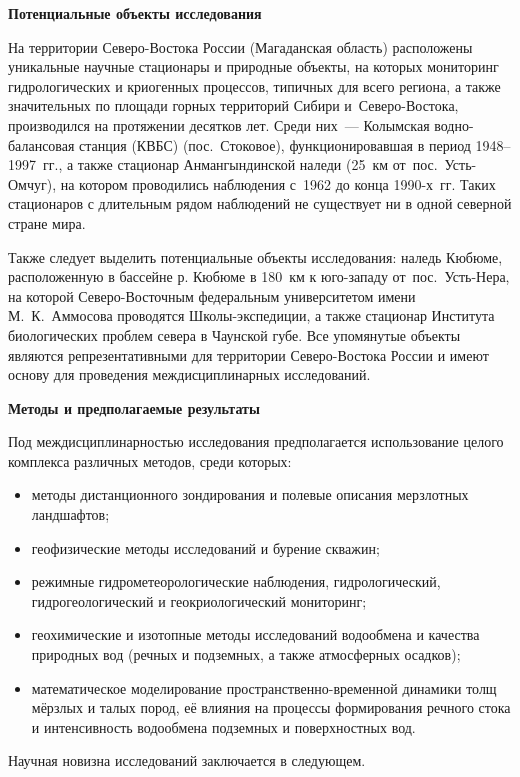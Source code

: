 

\textbf{Потенциальные объекты исследования}

На территории Северо-Востока России (Магаданская область) расположены уникальные научные стационары и природные объекты, на которых мониторинг гидрологических и криогенных процессов, типичных для всего региона, а также значительных по площади горных территорий Сибири и~Северо-Востока, производился на протяжении десятков лет. Среди них~--- Колымская водно-балансовая станция (КВБС) (пос.~Стоковое), функционировавшая в период 1948--1997~гг., а также стационар Анмангындинской наледи (25~км от~пос.~Усть-Омчуг), на котором проводились наблюдения с~1962 до конца 1990-х~гг. Таких стационаров с длительным рядом наблюдений не существует ни в одной северной стране мира.

Также следует выделить потенциальные объекты исследования: наледь Кюбюме, расположенную в бассейне р. Кюбюме в 180~км к юго-западу от~пос.~Усть-Нера, на которой Северо-Восточным федеральным университетом имени М.~К.~Аммосова проводятся Школы-экспедиции, а также стационар Института биологических проблем севера в Чаунской губе. Все упомянутые объекты являются репрезентативными для территории Северо-Востока России и имеют основу для проведения междисциплинарных исследований.

\textbf{Методы и предполагаемые результаты}

Под междисциплинарностью исследования предполагается использование целого комплекса различных методов, среди которых:
\begin{itemize}[noitemsep]\vspace{-8pt}
  \item методы дистанционного зондирования и полевые описания мерзлотных ландшафтов;
  \item геофизические методы исследований и бурение скважин;
  \item режимные гидрометеорологические наблюдения, гидрологический, гидрогеологический и геокриологический мониторинг;
  \item геохимические и изотопные методы исследований водообмена и качества природных вод (речных и подземных, а также атмосферных осадков);
  \item математическое моделирование пространственно-временной динамики толщ мёрзлых и талых пород, её влияния на процессы формирования речного стока и интенсивность водообмена подземных и поверхностных вод.
\end{itemize}
 \vspace{-8pt}
Научная новизна исследований заключается в следующем.

